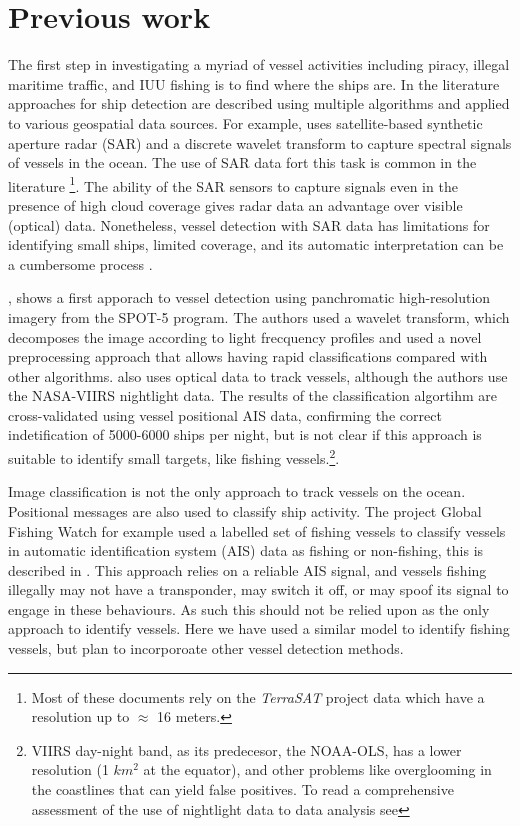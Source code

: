 \section{Previous work}
The first step in investigating a myriad of vessel activities including piracy, illegal maritime traffic, and IUU fishing is to find where the ships are. In the literature approaches for ship detection are described using multiple algorithms and applied to various geospatial data sources. For example,  uses satellite-based synthetic aperture radar (SAR) and a discrete wavelet transform to capture spectral signals of vessels in the ocean. The use of SAR data fort this task is common in the literature \cite{Margarit2009, Brusch2011, Corbane2008, Paes2010} \footnote{Most of these documents rely on the \textit{TerraSAT} project data which have a resolution up to $\approx$ 16 meters.}. The ability of the SAR sensors to capture signals even in the presence of high cloud coverage gives radar data an advantage over visible (optical) data. Nonetheless, vessel detection with SAR data has limitations for identifying small ships, limited coverage, and its automatic interpretation can be a cumbersome process \cite{Zhang2006}.  

, shows a first apporach to vessel detection using panchromatic high-resolution imagery from the SPOT-5 program. The authors used a wavelet transform, which decomposes the image according to light frecquency profiles and used a novel preprocessing approach that allows having rapid classifications compared with other algorithms.  also uses optical data to track vessels, although the authors use the NASA-VIIRS nightlight data. The results of the classification algortihm are cross-validated using vessel positional AIS data, confirming the correct indetification of 5000-6000 ships per night, but is not clear if this approach is suitable to identify small targets, like fishing vessels.\footnote{VIIRS day-night band, as its predecesor, the NOAA-OLS, has a lower resolution (1 $km^{2}$ at the equator), and other problems like overglooming in the coastlines that can yield false positives. To read a comprehensive assessment of the use of nightlight data to data analysis see }.

Image classification is not the only approach to track vessels on the ocean. Positional messages are also used to classify ship activity. The project Global Fishing Watch for example used a labelled set of fishing vessels to classify vessels in automatic identification system (AIS) data as fishing or non-fishing, this is described in . This approach relies on a reliable AIS signal, and vessels fishing illegally may not have a transponder, may switch it off, or may spoof its signal to engage in these behaviours. As such this should not be relied upon as the only approach to identify vessels. Here we have used a similar model to identify fishing vessels, but plan to incorporoate other vessel detection methods.
